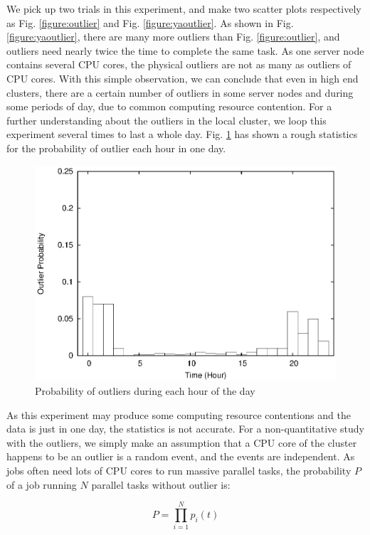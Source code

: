 We pick up two trials in this experiment, and make two scatter plots respectively as Fig.
\ref{figure:outlier} and Fig. \ref{figure:yaoutlier}. As shown in Fig.
\ref{figure:yaoutlier}, there are many more outliers than Fig. \ref{figure:outlier}, and
outliers need nearly twice the time to complete the same task. As one server node contains
several CPU cores, the physical outliers are not as many as outliers of CPU cores. With
this simple observation, we can conclude that even in high end clusters, there are a certain
number of outliers in some server nodes and during some periods of day, due to common computing resource
contention. For a further understanding about the outliers in the local cluster,
we loop this experiment several times to last a whole day. Fig.
\ref{figure:outlier_stats} has shown a rough statistics for the probability of outlier
each hour in one day.

\begin{figure}
\centering
\includegraphics[width=0.9\columnwidth]{figures/outlier_stats.eps}
\caption{Probability of outliers during each hour of the day}
\label{figure:outlier_stats}
\end{figure}

As this experiment may produce some computing resource contentions and the data is just in
one day, the statistics is not accurate. For a non-quantitative study with the outliers, we
simply make an assumption that a CPU core of the cluster happens to be an outlier is a
random event, and the events are independent. As jobs often need lots of CPU cores to run
massive parallel tasks, the probability $P$ of a job running $N$ parallel tasks without
outlier is:

$$P = \prod_{i=1}^N p_i(t)$$

